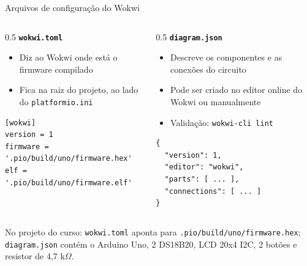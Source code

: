 \documentclass[aspectratio=169]{beamer}
\begin{document}
\begin{frame}[fragile]{Arquivos de configuração do Wokwi}
    \begin{columns}[T]
        \begin{column}{0.5\textwidth}
            \textbf{\texttt{wokwi.toml}}
            \begin{itemize}
                \item Diz ao Wokwi onde está o firmware compilado
                \item Fica na raiz do projeto, ao lado do \texttt{platformio.ini}
            \end{itemize}
            \begin{verbatim}
[wokwi]
version = 1
firmware = '.pio/build/uno/firmware.hex'
elf = '.pio/build/uno/firmware.elf'
            \end{verbatim}
        \end{column}
        \begin{column}{0.5\textwidth}
            \textbf{\texttt{diagram.json}}
            \begin{itemize}
                \item Descreve os componentes e as conexões do circuito
                \item Pode ser criado no editor online do Wokwi ou manualmente
                \item Validação: \texttt{wokwi-cli lint}
            \end{itemize}
            \begin{verbatim}
{
  "version": 1,
  "editor": "wokwi",
  "parts": [ ... ],
  "connections": [ ... ]
}
            \end{verbatim}
        \end{column}
    \end{columns}
    \vfill
    \footnotesize{No projeto do curso: \texttt{wokwi.toml} aponta para \texttt{.pio/build/uno/firmware.hex}; \texttt{diagram.json} contém o Arduino Uno, 2 DS18B20, LCD 20x4 I2C, 2 botões e resistor de 4,7 k$\Omega$.}
\end{frame}
\end{document}
